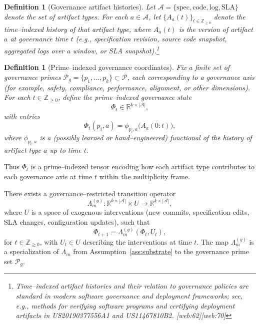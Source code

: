 \documentclass[11pt]{article}
\newtheorem{definition}[theorem]{Definition}
\begin{document}
\begin{definition}[Governance artifact histories]\label{def:artifacts}
Let $\mathcal{A} = \{\text{spec}, \text{code}, \text{log}, \text{SLA}\}$ denote the set of artifact types. For each $a \in \mathcal{A}$, let $\{A_a(t)\}_{t \in \mathbb{Z}_{\ge 0}}$ denote the time--indexed history of that artifact type, where $A_a(t)$ is the version of artifact $a$ at governance time $t$ (e.g., specification revision, source code snapshot, aggregated logs over a window, or SLA snapshot).\footnote{Time--indexed artifact histories and their relation to governance policies are standard in modern software governance and deployment frameworks; see, e.g., methods for verifying software programs and certifying deployment artifacts in US20190377556A1 and US11467810B2. [web:62][web:70]}
\end{definition}

\begin{definition}[Prime--indexed governance coordinates]\label{def:Phi}
Fix a finite set of governance primes $\mathcal{P}_g = \{p_1,\dots,p_k\} \subset \mathcal{P}$, each corresponding to a governance axis (for example, safety, compliance, performance, alignment, or other dimensions). For each $t \in \mathbb{Z}_{\ge 0}$, define the prime--indexed governance state
\[
  \Phi_t \in \mathbb{R}^{k \times |\mathcal{A}|},
\]
with entries
\[
  \Phi_t(p_i,a) = \phi_{p_i,a}\big(A_a(0{:}t)\big),
\]
where $\phi_{p_i,a}$ is a (possibly learned or hand--engineered) functional of the history of artifact type $a$ up to time $t$.
\end{definition}

Thus $\Phi_t$ is a prime--indexed tensor encoding how each artifact type contributes to each governance axis at time $t$ within the multiplicity frame.

\begin{assumption}\label{ass:Lambda-gov}
There exists a governance--restricted transition operator
\[
  \Lambda_m^{(g)} : \mathbb{R}^{k \times |\mathcal{A}|} \times U \to \mathbb{R}^{k \times |\mathcal{A}|},
\]
where $U$ is a space of exogenous interventions (new commits, specification edits, SLA changes, configuration updates), such that
\[
  \Phi_{t+1} = \Lambda_m^{(g)}(\Phi_t, U_t),
\]
for $t \in \mathbb{Z}_{\ge 0}$, with $U_t \in U$ describing the interventions at time $t$. The map $\Lambda_m^{(g)}$ is a specialization of $\Lambda_m$ from Assumption~\ref{ass:substrate} to the governance prime set $\mathcal{P}_g$.
\end{assumption}
\end{document}

